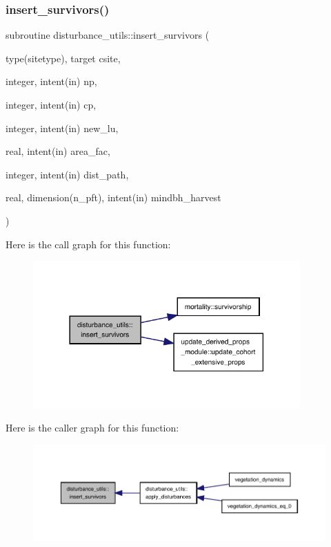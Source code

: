 \subsubsection{\texorpdfstring{insert\+\_\+survivors()}{insert\_survivors()}}
{\footnotesize\ttfamily subroutine disturbance\+\_\+utils\+::insert\+\_\+survivors (\begin{DoxyParamCaption}\item[{type(sitetype), target}]{csite,  }\item[{integer, intent(in)}]{np,  }\item[{integer, intent(in)}]{cp,  }\item[{integer, intent(in)}]{new\+\_\+lu,  }\item[{real, intent(in)}]{area\+\_\+fac,  }\item[{integer, intent(in)}]{dist\+\_\+path,  }\item[{real, dimension(n\+\_\+pft), intent(in)}]{mindbh\+\_\+harvest }\end{DoxyParamCaption})}

Here is the call graph for this function\+:
\nopagebreak
\begin{figure}[H]
\begin{center}
\leavevmode
\includegraphics[width=290pt]{namespacedisturbance__utils_ac25d6a408136dff3bccca56269ca858f_cgraph}
\end{center}
\end{figure}
Here is the caller graph for this function\+:
\nopagebreak
\begin{figure}[H]
\begin{center}
\leavevmode
\includegraphics[width=350pt]{namespacedisturbance__utils_ac25d6a408136dff3bccca56269ca858f_icgraph}
\end{center}
\end{figure}
\mbox{\label{namespacedisturbance__utils_ac78f23ae05ca7cd196ebeeda52e66507}} 
